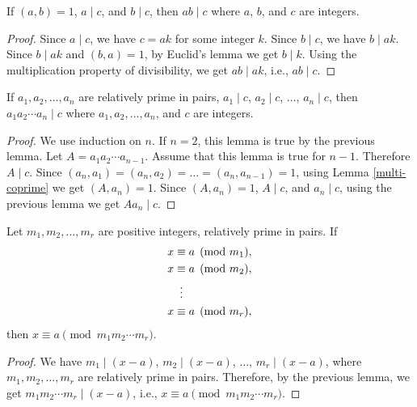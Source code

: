 \begin{lemma}
  \label{ap-coprime-divisibility}
  If \( (a, b) = 1 \), \( a \mid c \), and \( b \mid c \), then \( ab
  \mid c \) where \( a \), \( b \), and \( c \) are integers.
\end{lemma}

\begin{proof}
  Since \( a \mid c \), we have \( c = ak \) for some integer \( k \).
  Since \( b \mid c \), we have \( b \mid ak \). Since \( b \mid ak \)
  and \( (b, a) = 1 \), by Euclid's lemma we get \( b \mid k \). Using
  the multiplication property of divisibility, we get \( ab \mid ak
  \), i.e., \( ab \mid c \).
\end{proof}


\begin{lemma}
  \label{ap-multi-coprime-divisibility}
  If \( a_1, a_2, \dots, a_n \) are relatively prime in pairs, \( a_1
  \mid c \), \( a_2 \mid c \), \( \dots \), \( a_n \mid c \), then \(
  a_1 a_2 \cdots a_n \mid c \) where \( a_1, a_2, \dots, a_n \), and
  \( c \) are integers.
\end{lemma}

\begin{proof}
  We use induction on \( n \). If \( n = 2 \), this lemma is true by
  the previous lemma. Let \( A = a_1 a_2 \cdots a_{n-1} \). Assume
  that this lemma is true for \( n - 1 \). Therefore \( A \mid c \).
  Since \( (a_n, a_1) = (a_n, a_2) = \dots = (a_n, a_{n-1}) = 1 \),
  using Lemma \ref{multi-coprime} we get \( (A, a_n) = 1 \). Since \(
  (A, a_n) = 1 \), \( A \mid c \), and \( a_n \mid c \), using the
  previous lemma we get \( A a_n \mid c \).
\end{proof}


\begin{lemma}
  \label{ap-multi-coprime-congruence}
  Let \( m_1, m_2, \dots, m_r \) are positive integers, relatively
  prime in pairs. If
  \begin{align*}
    x & \equiv a \pmod{m_1}, \\
    x & \equiv a \pmod{m_2}, \\
      & \vdotswithin{\equiv} \\
    x & \equiv a \pmod{m_r}, \\
  \end{align*}
  then \( x \equiv a \pmod{m_1 m_2 \cdots m_r} \).
\end{lemma}

\begin{proof}
  We have \( m_1 \mid (x - a) \), \( m_2 \mid (x - a) \), \( \dots \),
  \( m_r \mid (x - a) \), where \( m_1, m_2, \dots, m_r \) are
  relatively prime in pairs. Therefore, by the previous lemma, we get
  \( m_1 m_2 \cdots m_r \mid (x - a) \), i.e., \( x \equiv a \pmod{m_1
    m_2 \cdots m_r} \).
\end{proof}


